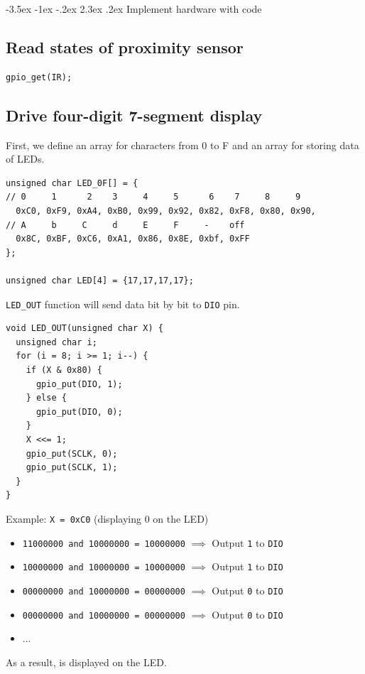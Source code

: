 \documentclass[a4paper,twoside]{report}
\makeatletter
\renewcommand\section{\@startsection {section}{1}{-1em}%
  {-3.5ex \@plus -1ex \@minus -.2ex}%
  {2.3ex \@plus.2ex}%
  {\normalfont\Large\bfseries}}
\makeatother
\begin{document}
\section{Implement hardware with code}
\subsection{Read states of proximity sensor}
\begin{verbatim}
gpio_get(IR);
\end{verbatim}

\subsection{Drive four-digit 7-segment display}
First, we define an array for characters from 0 to F and an array for storing data of LEDs.
\begin{verbatim}
unsigned char LED_0F[] = {
// 0     1      2    3     4     5      6    7     8     9
  0xC0, 0xF9, 0xA4, 0xB0, 0x99, 0x92, 0x82, 0xF8, 0x80, 0x90, 
// A     b     C     d     E     F     -    off
  0x8C, 0xBF, 0xC6, 0xA1, 0x86, 0x8E, 0xbf, 0xFF
};

unsigned char LED[4] = {17,17,17,17};
\end{verbatim}

\texttt{LED\_OUT} function will send data bit by bit to \texttt{DIO} pin.

\begin{verbatim}
void LED_OUT(unsigned char X) {
  unsigned char i;
  for (i = 8; i >= 1; i--) {
    if (X & 0x80) {
      gpio_put(DIO, 1);
    } else {
      gpio_put(DIO, 0);
    }
    X <<= 1;
    gpio_put(SCLK, 0);
    gpio_put(SCLK, 1);
  }
}
\end{verbatim}

Example: \texttt{X = 0xC0} (displaying 0 on the LED)
\begin{itemize}
\item \texttt{11000000 and 10000000 = 10000000} $\implies$ Output \texttt{1} to \texttt{DIO}
\item \texttt{10000000 and 10000000 = 10000000} $\implies$ Output \texttt{1} to \texttt{DIO}
\item \texttt{00000000 and 10000000 = 00000000} $\implies$ Output \texttt{0} to \texttt{DIO}
\item \texttt{00000000 and 10000000 = 00000000} $\implies$ Output \texttt{0} to \texttt{DIO}
\item ...
\end{itemize}
As a result,  is displayed on the LED.
\end{document}
